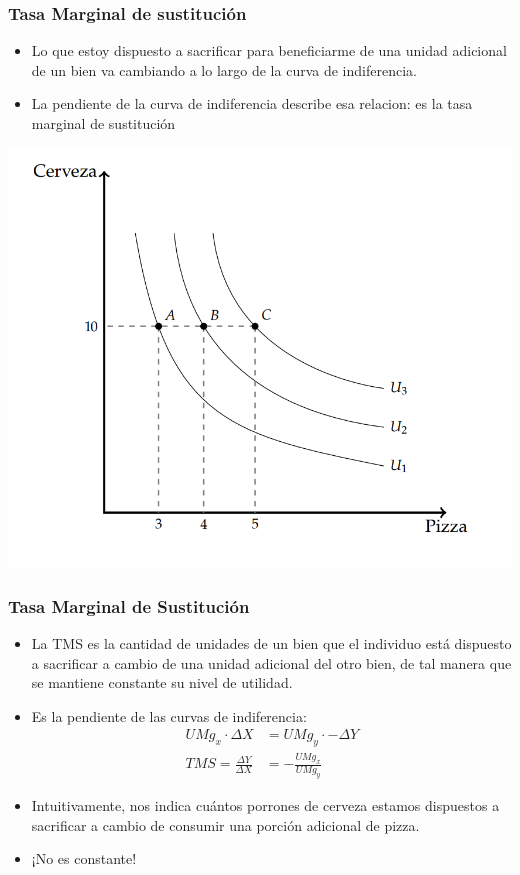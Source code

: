 \documentclass{beamer}
\begin{document}
\begin{frame}
\frametitle{Tasa Marginal de sustitución}
\begin{itemize}
    \item Lo que estoy dispuesto a sacrificar para beneficiarme de una unidad adicional de un bien va cambiando a lo largo de la curva de indiferencia.
    \item La pendiente de la curva de indiferencia describe esa relacion: es la tasa marginal de sustitución
\end{itemize} 
\centering
\includegraphics[scale=0.5]{../Figures/C7.9.png}
\end{frame}

\begin{frame}
\frametitle{Tasa Marginal de Sustitución}
\begin{itemize}
    \item La TMS es la cantidad de unidades de un bien que el individuo está dispuesto a sacrificar a cambio de una unidad adicional del otro bien, de tal manera que se mantiene constante su nivel de utilidad.
    \item Es la pendiente de las curvas de indiferencia:
    \begin{align*}
        UMg_x \cdot \Delta X &= UMg_y \cdot - \Delta Y \\
        TMS = \frac{\Delta Y}{\Delta X} &= - \frac{UMg_x}{UMg_y}
    \end{align*}    
    \item Intuitivamente, nos indica cuántos porrones de cerveza estamos dispuestos a sacrificar a cambio de consumir una porción adicional de pizza.
    \item ¡No es constante!
\end{itemize} 
\end{frame}
\end{document}
